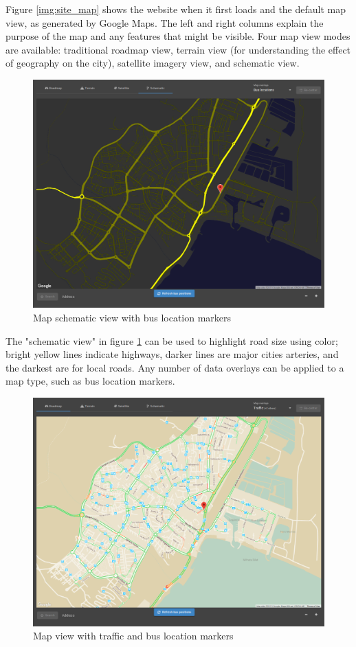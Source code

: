 \documentclass[12pt]{article}                       %
\begin{document}
Figure \ref{img:site_map} shows the website when it first loads and the default map view, as generated by Google Maps. The left and right columns explain the purpose of the map and any features that might be visible. Four map view modes are available: traditional roadmap view, terrain view (for understanding the effect of geography on the city), satellite imagery view, and schematic view.

\newpage %
\begin{figure}[H]
    \centering
    \includegraphics[width=12cm]{images/site_map_schematic.png}
    \caption{Map schematic view with bus location markers} 
    \label{img:site_map_schematic}
\end{figure}

The "schematic view" in figure \ref{img:site_map_schematic} can be used to highlight road size using color; bright yellow lines indicate highways, darker lines are major cities arteries, and the darkest are for local roads. Any number of data overlays can be applied to a map type, such as bus location markers.

\newpage
\begin{figure}[H]
    \centering
    \includegraphics[width=12cm]{images/site_map_traffic.png}
    \caption{Map view with traffic and bus location markers}
    \label{img:site_map_traffic}
\end{figure}
\end{document}
